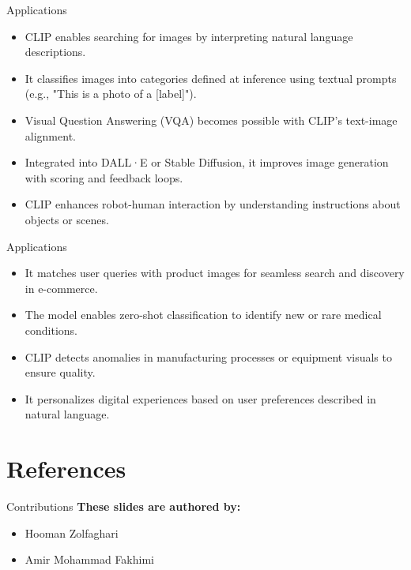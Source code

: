 \documentclass[serif, aspectratio=169]{beamer}
\begin{document}
\begin{frame}{Applications}
    \begin{itemize}
        \item CLIP enables searching for images by interpreting natural language descriptions.
        \item It classifies images into categories defined at inference using textual prompts (e.g., "This is a photo of a [label]").
        \item Visual Question Answering (VQA) becomes possible with CLIP’s text-image alignment.
        \item Integrated into DALL·E or Stable Diffusion, it improves image generation with scoring and feedback loops.
        \item CLIP enhances robot-human interaction by understanding instructions about objects or scenes.
    \end{itemize}
\end{frame}


\begin{frame}{Applications}
    \begin{itemize}
        \item It matches user queries with product images for seamless search and discovery in e-commerce.
       \item The model enables zero-shot classification to identify new or rare medical conditions.
        \item CLIP detects anomalies in manufacturing processes or equipment visuals to ensure quality.
        \item It personalizes digital experiences based on user preferences described in natural language.
    \end{itemize}
\end{frame}


\section{References}

\begin{frame}{Contributions}
\textbf{These slides are authored by:}
    \begin{itemize}
        \item Hooman Zolfaghari
        \item Amir Mohammad Fakhimi
    \end{itemize}
    
\end{frame}


\begin{frame}[allowframebreaks]
   \nocite{*} %
\end{frame}
\end{document}
